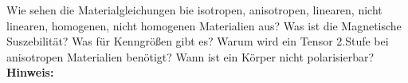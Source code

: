 \begin{question}[section=2,subsection=22,name={Einfache Materialgleichungen},difficulty=3,type=mdl,tags={}]
	Wie sehen die Materialgleichungen bie isotropen, anisotropen, linearen, nicht linearen, homogenen, nicht homogenen Materialien aus? Was ist die Magnetische Suszebilität? Was für Kenngrößen gibt es? Warum wird ein Tensor 2.Stufe bei anisotropen Materialien benötigt? Wann ist ein Körper nicht polarisierbar?
	\\ \textbf{Hinweis:}\\
	
\end{question}
\begin{solution}
	
\end{solution}